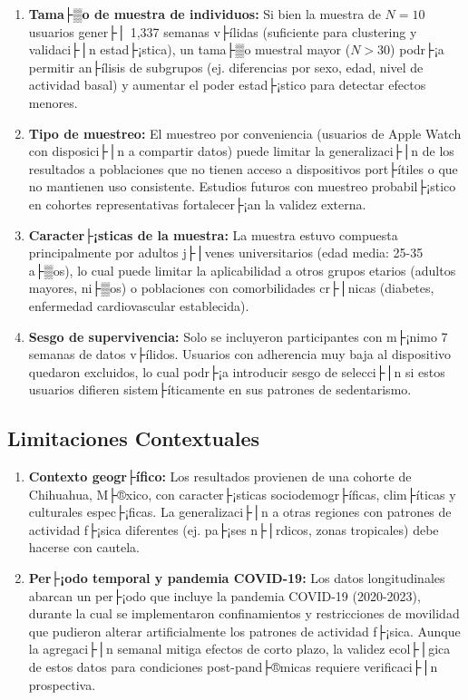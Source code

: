 \begin{enumerate}
    \item \textbf{Tama├▒o de muestra de individuos:} Si bien la muestra de $N=10$ usuarios gener├│ 1,337 semanas v├ílidas (suficiente para clustering y validaci├│n estad├¡stica), un tama├▒o muestral mayor ($N > 30$) podr├¡a permitir an├ílisis de subgrupos (ej. diferencias por sexo, edad, nivel de actividad basal) y aumentar el poder estad├¡stico para detectar efectos menores.
    
    \item \textbf{Tipo de muestreo:} El muestreo por conveniencia (usuarios de Apple Watch con disposici├│n a compartir datos) puede limitar la generalizaci├│n de los resultados a poblaciones que no tienen acceso a dispositivos port├ítiles o que no mantienen uso consistente. Estudios futuros con muestreo probabil├¡stico en cohortes representativas fortalecer├¡an la validez externa.
    
    \item \textbf{Caracter├¡sticas de la muestra:} La muestra estuvo compuesta principalmente por adultos j├│venes universitarios (edad media: 25-35 a├▒os), lo cual puede limitar la aplicabilidad a otros grupos etarios (adultos mayores, ni├▒os) o poblaciones con comorbilidades cr├│nicas (diabetes, enfermedad cardiovascular establecida).
    
    \item \textbf{Sesgo de supervivencia:} Solo se incluyeron participantes con m├¡nimo 7 semanas de datos v├ílidos. Usuarios con adherencia muy baja al dispositivo quedaron excluidos, lo cual podr├¡a introducir sesgo de selecci├│n si estos usuarios difieren sistem├íticamente en sus patrones de sedentarismo.
\end{enumerate}

\subsection{Limitaciones Contextuales}
\label{subsec:limitaciones_contextuales}

\begin{enumerate}
    \item \textbf{Contexto geogr├ífico:} Los resultados provienen de una cohorte de Chihuahua, M├®xico, con caracter├¡sticas sociodemogr├íficas, clim├íticas y culturales espec├¡ficas. La generalizaci├│n a otras regiones con patrones de actividad f├¡sica diferentes (ej. pa├¡ses n├│rdicos, zonas tropicales) debe hacerse con cautela.
    
    \item \textbf{Per├¡odo temporal y pandemia COVID-19:} Los datos longitudinales abarcan un per├¡odo que incluye la pandemia COVID-19 (2020-2023), durante la cual se implementaron confinamientos y restricciones de movilidad que pudieron alterar artificialmente los patrones de actividad f├¡sica. Aunque la agregaci├│n semanal mitiga efectos de corto plazo, la validez ecol├│gica de estos datos para condiciones post-pand├®micas requiere verificaci├│n prospectiva.
\end{enumerate}

